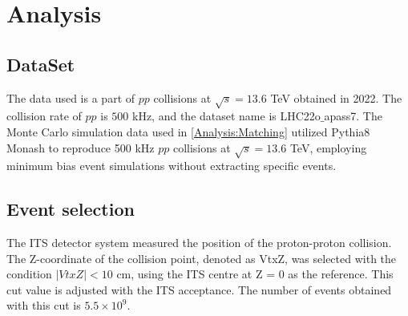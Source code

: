 \section{Analysis}
\label{Analysis}
    \subsection{DataSet}
    \label{DataSet}
        The data used is a part of $pp$ collisions at $\sqrt{s}=13.6$ TeV obtained in 2022. The collision rate of $pp$ is $500$ kHz, and the dataset name is LHC22o$\_$apass7.
        The Monte Carlo simulation data used in \ref{Analysis:Matching} utilized Pythia8 Monash to reproduce 500 kHz $pp$ collisions at $\sqrt{s}=13.6$ TeV, employing minimum bias event simulations without extracting specific events.
        
    \subsection{Event selection}
    \label{Event_selection}
        The ITS detector system measured the position of the proton-proton collision. The Z-coordinate of the collision point, denoted as VtxZ, was selected with the condition $|VtxZ| < 10$ cm, using the ITS centre at Z = 0 as the reference. This cut value is adjusted with the ITS acceptance. The number of events obtained with this cut is $5.5 \times 10^9$.\@

